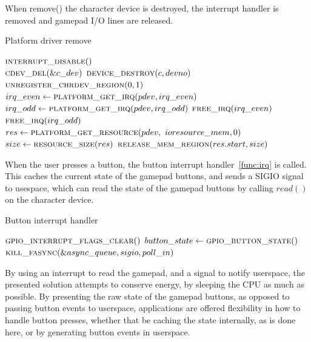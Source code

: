 When remove() the character device is destroyed, the interrupt handler is
removed and gamepad I/O lines are released.
 
\begin{algorithm}[H]
  \footnotesize
  \caption{Platform driver remove}
  \begin{algorithmic}[1]
      \State $\Call{interrupt\_disable}{\null}$ \\
      \State $\Call{cdev\_del}{\&c\_dev}$
      \State $\Call{device\_destroy}{c, devno}$
      \State $\Call{unregister\_chrdev\_region}{0, 1}$ \\

      \State $irq\_even \gets \Call{platform\_get\_irq}{pdev, irq\_even}$
      \State $irq\_odd \gets \Call{platform\_get\_irq}{pdev, irq\_odd}$
      \State $\Call{free\_irq}{irq\_even}$
      \State $\Call{free\_irq}{irq\_odd}$ \\

      \State $res \gets \Call{platform\_get\_resource}{pdev, \
        ioresource\_mem, 0}$
      \State $size \gets \Call{resource\_size}{res}$
      \State $\Call{release\_mem\_region}{res.start, size}$
    \EndFunction
  \end{algorithmic}
  \label{func:remove}
\end{algorithm}

When the user presses a button, the button interrupt handler~\ref{func:irq} is
called. This caches the current state of the gamepad buttons, and sends a SIGIO
signal to usespace, which can read the state of the gamepad buttons by calling
$read()$ on the character device.

\begin{algorithm}
  \footnotesize
  \caption{Button interrupt handler}
  \begin{algorithmic}[1]
      \State $\Call{gpio\_interrupt\_flags\_clear}{\null}$
      \State $button\_state \gets \Call{gpio\_button\_state}{\null}$
      \If {$async\_queue$}
        \State $\Call{kill\_fasync}{\&async\_queue, sigio, poll\_in}$
      \EndIf
    \EndFunction
  \end{algorithmic}
  \label{func:irq}
\end{algorithm}

By using an interrupt to read the gamepad, and a signal to notify userspace,
the presented solution attempts to conserve energy, by sleeping the CPU as much
as possible. By presenting the raw state of the gamepad buttons, as opposed to
passing button events to userspace, applications are offered flexibility in how
to handle button presses, whether that be caching the state internally, as is
done here, or by generating button events in userspace.

